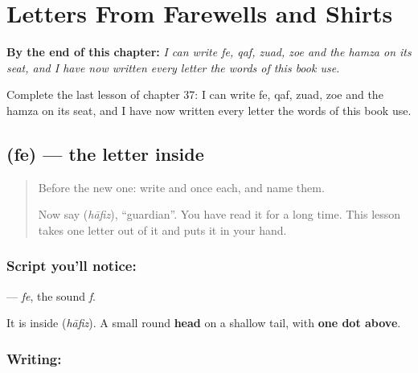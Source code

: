 
\chapter{Letters From Farewells and Shirts}
\label{ch:ur-letters-farewells-shirts}

\begin{chapteropening}
\textbf{By the end of this chapter:} \emph{I can write fe, qaf, zuad, zoe and the hamza on its seat, and I have now written every letter the words of this book use.}

Complete the last lesson of chapter 37: I can write fe, qaf, zuad, zoe and the hamza on its seat, and I have now written every letter the words of this book use.
\end{chapteropening}

\section[\texorpdfstring{\ur{ف} (fe)}{ف (fe)}]{ (fe) — the letter inside }

\label{lesson:UR-W37-fe}



\begin{quote}
Before the new one: write  and  once each, and name them.

Now say \textbf{} (\emph{hāfiz}), \textquotedblleft{}guardian\textquotedblright{}. You have read it for a long time. This lesson takes one letter out of it and puts it in your hand.
\end{quote}

\subsection*{Script you'll notice: }
\textbf{} — \emph{fe}, the sound \emph{f}.

It is inside \textbf{} (\emph{hāfiz}). A small round \textbf{head} on a shallow tail, with \textbf{one dot above}.

\subsection*{Writing: }

